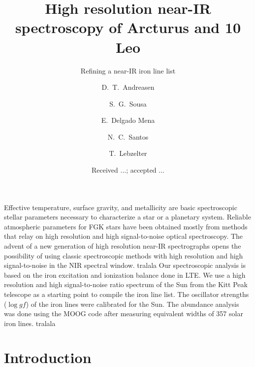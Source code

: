 \documentclass{aa}
\begin{document}
\title{High resolution near-IR spectroscopy of Arcturus and 10 Leo}
\subtitle{Refining a near-IR iron line list}


\author{ D.~T.~Andreasen
    \and S.~G.~Sousa
    \and E.~Delgado Mena
    \and N.~C.~Santos
    \and T.~Lebzelter}







\date{Received ...; accepted ...}

\abstract
{Effective temperature, surface gravity, and metallicity are basic
spectroscopic stellar parameters necessary to characterize
a star or a planetary system. Reliable atmospheric parameters for
FGK stars have been obtained mostly from methods that relay on high
resolution and high signal-to-noise optical spectroscopy. The
advent of a new generation of high resolution near-IR spectrographs
opens the possibility of using classic spectroscopic methods with
high resolution and high signal-to-noise in the NIR spectral window.}
{tralala}
{Our spectroscopic analysis is based on the iron excitation and ionization
balance done in LTE. We use a high resolution and high signal-to-noise ratio
spectrum of the Sun from the Kitt Peak telescope as a starting point to compile
the iron line list. The oscillator strengths ($\log\mathit{gf}$) of the iron
lines were calibrated for the Sun. The abundance analysis was done using the
MOOG code after measuring equivalent widths of 357 solar iron lines.}
{tralala}
{}



\maketitle



\section{Introduction}
\label{sec:introduction}
\end{document}
